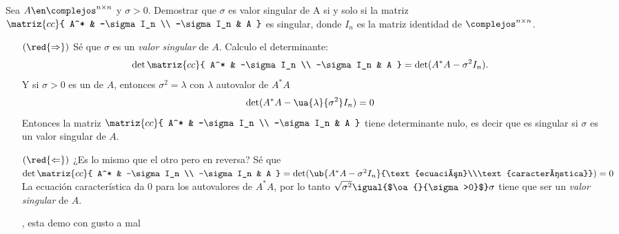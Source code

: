 \begin{enunciado}{\ejercicio}
  Sea $A \en \complejos^{n \times n}$ y $\sigma > 0$. Demostrar que $\sigma$ es valor singular de A
  si y solo si la matriz
  $\matriz{cc}{
      A^* & -\sigma I_n \\
      -\sigma I_n & A
    }$
  es singular, donde $I_n$ es la matriz identidad de $\complejos^{n \times n}$.
\end{enunciado}

\begin{itemize}
  \item[$(\red{\Rightarrow})$] Sé que $\sigma$ es un \textit{valor singular} de $A$. Calculo el determinante:
        $$
          \det
          \matriz{cc}{
            A^* & -\sigma I_n \\
            -\sigma I_n & A
          } =
          \det(A^*A - \sigma^2I_n).
        $$
        Y si
        $\sigma > 0$ es un  de $A$, entonces $\sigma^2 = \lambda$ con $\lambda$ autovalor de $A^*A$
        $$
          \det(A^*A - \ua{\lambda}{\sigma^2}I_n) = 0
        $$
        Entonces la matriz
        $
          \matriz{cc}{
            A^* & -\sigma I_n \\
            -\sigma I_n & A
          }$ tiene determinante nulo, es decir que es singular si $\sigma$ es un valor singular de $A$.

  \item[$(\red{\Leftarrow})$]
        ¿Es lo mismo que el otro pero en reversa?
        Sé que $\det\matriz{cc}{
            A^* & -\sigma I_n \\
            -\sigma I_n & A
          } =
          \det(\ub{A^*A - \sigma^2I_n}{\text{ecuación}\\\text{característica}})=
          0$
        La ecuación característica da 0 para los autovalores de $A^*A$, por lo tanto $\sqrt{\sigma^2} \igual{$\oa{}{\sigma>0}$} \sigma$ tiene que ser
        un \textit{valor singular} de $A$.

          {\huge {}, esta demo con gusto a mal}
\end{itemize}

\begin{aportes}
  \item {}
\end{aportes}
